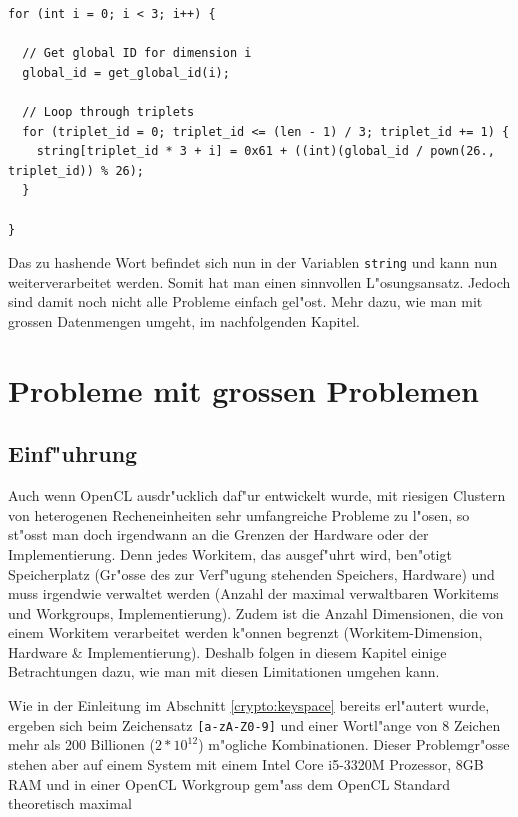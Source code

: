 \begin{refsection}
\begin{small}
\begin{verbatim}
for (int i = 0; i < 3; i++) {

  // Get global ID for dimension i
  global_id = get_global_id(i);

  // Loop through triplets
  for (triplet_id = 0; triplet_id <= (len - 1) / 3; triplet_id += 1) {
    string[triplet_id * 3 + i] = 0x61 + ((int)(global_id / pown(26., triplet_id)) % 26);
  }

}
\end{verbatim}
\end{small}

\noindent Das zu hashende Wort befindet sich nun in der Variablen
\texttt{string} und kann nun weiterverarbeitet werden. Somit hat man einen
sinnvollen L"osungsansatz. Jedoch sind damit noch nicht alle Probleme einfach
gel"ost. Mehr dazu, wie man mit grossen Datenmengen umgeht, im nachfolgenden
Kapitel.


\section{Probleme mit grossen Problemen}
\label{crypto:grosse_probleme}

\subsection{Einf"uhrung}

Auch wenn OpenCL ausdr"ucklich daf"ur entwickelt wurde, mit riesigen Clustern
von heterogenen Recheneinheiten sehr umfangreiche Probleme zu l"osen, so st"osst
man doch irgendwann an die Grenzen der Hardware oder der Implementierung.  Denn
jedes Workitem, das ausgef"uhrt wird, ben"otigt Speicherplatz (Gr"osse des zur
Verf"ugung stehenden Speichers, Hardware) und muss irgendwie verwaltet werden
(Anzahl der maximal verwaltbaren Workitems und Workgroups, Implementierung).
Zudem ist die Anzahl Dimensionen, die von einem Workitem verarbeitet werden k"onnen
begrenzt (Workitem-Dimension, Hardware \& Implementierung). Deshalb folgen in
diesem Kapitel einige Betrachtungen dazu, wie man mit diesen Limitationen
umgehen kann.

Wie in der Einleitung im Abschnitt \ref{crypto:keyspace} bereits erl"autert
wurde, ergeben sich beim Zeichensatz \texttt{[a-zA-Z0-9]} und einer Wortl"ange
von 8 Zeichen mehr als 200 Billionen ($2 * 10^{12}$) m"ogliche Kombinationen.
Dieser Problemgr"osse stehen aber auf einem System mit einem Intel Core i5-3320M
Prozessor, 8GB RAM und in einer OpenCL Workgroup gem"ass dem OpenCL Standard
theoretisch maximal


\end{refsection}
